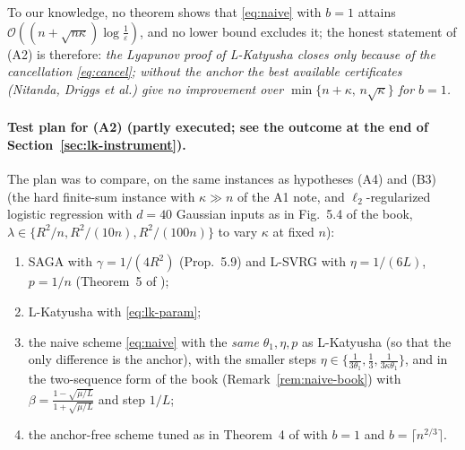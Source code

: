 To our knowledge, no theorem shows that \eqref{eq:naive} with $b=1$ attains $\mathcal O((n+\sqrt{n\kappa})\log\frac1\varepsilon)$, and no lower bound excludes it; the honest statement of (A2) is therefore: \emph{the Lyapunov proof of L-Katyusha closes only because of the cancellation \eqref{eq:cancel}; without the anchor the best available certificates (Nitanda, Driggs et al.) give no improvement over $\min\{n+\kappa,\,n\sqrt\kappa\}$ for $b=1$.}

\paragraph{Test plan for (A2) (partly executed; see the outcome at the end of Section~\ref{sec:lk-instrument}).} The plan was to compare, on the same instances as hypotheses (A4) and (B3) (the hard finite-sum instance with $\kappa\gg n$ of the A1 note, and $\ell_2$-regularized logistic regression with $d=40$ Gaussian inputs as in Fig.~5.4 of the book, $\lambda\in\{R^2/n,R^2/(10n),R^2/(100n)\}$ to vary $\kappa$ at fixed $n$):
\begin{enumerate}
\item SAGA with $\gamma=1/(4R^2)$ (Prop.~5.9) and L-SVRG with $\eta=1/(6L)$, $p=1/n$ (Theorem~5 of \cite{kovalev2020dont});
\item L-Katyusha with \eqref{eq:lk-param};
\item the naive scheme \eqref{eq:naive} with the \emph{same} $\theta_1,\eta,p$ as L-Katyusha (so that the only difference is the anchor), with the smaller steps $\eta\in\{\frac1{3\theta_1},\frac1{3},\frac1{3\kappa\theta_1}\}$, and in the two-sequence form of the book (Remark~\ref{rem:naive-book}) with $\beta=\frac{1-\sqrt{\mu/L}}{1+\sqrt{\mu/L}}$ and step $1/L$;
\item the anchor-free scheme tuned as in Theorem~4 of \cite{driggs2022accelerating} with $b=1$ and $b=\lceil n^{2/3}\rceil$.
\end{enumerate}
